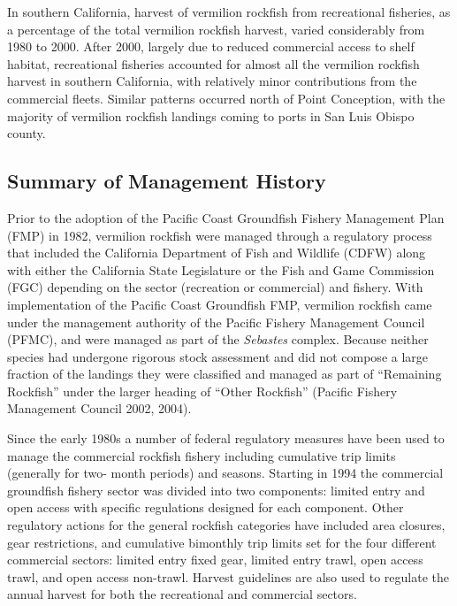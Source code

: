 \documentclass[11pt,
  english,
]{article}
\begin{document}
In southern California, harvest of vermilion rockfish from recreational fisheries, as a percentage of the total vermilion rockfish harvest, varied considerably from 1980 to 2000. After 2000, largely due to reduced commercial access to shelf habitat, recreational fisheries accounted for almost all the vermilion rockfish harvest in southern California, with relatively minor contributions from the commercial fleets. Similar patterns occurred north of Point Conception, with the majority of vermilion rockfish landings coming to ports in San Luis Obispo county.


\hypertarget{summary-of-management-history}{%
\subsection{Summary of Management History}\label{summary-of-management-history}}

\leavevmode\tagmcend\tagstructend

Prior to the adoption of the Pacific Coast Groundfish Fishery Management Plan (FMP) in 1982, vermilion rockfish were managed through a regulatory process that included the California Department of Fish and Wildlife (CDFW) along with either the California State Legislature or the Fish and Game Commission (FGC) depending on the sector (recreation or commercial) and fishery. With implementation of the Pacific Coast Groundfish FMP, vermilion rockfish came under the management authority of the Pacific Fishery Management Council (PFMC), and were managed as part of the \emph{Sebastes} complex. Because neither species had undergone rigorous stock assessment and did not compose a large fraction of the landings they were classified and managed as part of ``Remaining Rockfish'' under the larger heading of ``Other Rockfish'' {(Pacific Fishery Management Council 2002, 2004)\leavevmode\tagmcend\tagstructend}.

Since the early 1980s a number of federal regulatory measures have been used to manage the commercial rockfish fishery including cumulative trip limits (generally for two- month periods) and seasons. Starting in 1994 the commercial groundfish fishery sector was divided into two components: limited entry and open access with specific regulations designed for each component. Other regulatory actions for the general rockfish categories have included area closures, gear restrictions, and cumulative bimonthly trip limits set for the four different commercial sectors: limited entry fixed gear, limited entry trawl, open access trawl, and open access non-trawl. Harvest guidelines are also used to regulate the annual harvest for both the recreational and commercial sectors.
\end{document}

